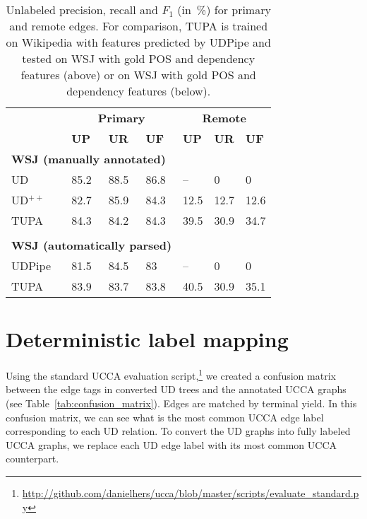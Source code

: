 \documentclass[11pt,a4paper]{article}
\begin{document}
\begin{table}[t]
\centering
\begin{tabular}{l|lll|lll}
& \multicolumn{3}{c|}{\footnotesize \bf Primary} & \multicolumn{3}{c}{\footnotesize \bf Remote} \\
& \footnotesize \textbf{UP} & \footnotesize \textbf{UR} & \footnotesize \textbf{UF}
& \footnotesize \textbf{UP} & \footnotesize \textbf{UR} & \footnotesize \textbf{UF} \\
\hline
\multicolumn{4}{l|}{\small \bf WSJ (manually annotated)} & \\
\footnotesize UD
& 85.2 & 88.5 & 86.8 & -- & 0 & 0 \\
\footnotesize UD$^{++}$
& 82.7 & 85.9 & 84.3 & 12.5 & 12.7 & 12.6 \\
\footnotesize TUPA
& 84.3 & 84.2 & 84.3 & 39.5 & 30.9 & 34.7 \\
\\
\multicolumn{4}{l|}{\small \bf WSJ (automatically parsed)} & \\
UDPipe & 81.5 & 84.5 & 83 & -- & 0 & 0 \\
\footnotesize TUPA
& 83.9 & 83.7 & 83.8 & 40.5 & 30.9 & 35.1
\end{tabular}
\caption{
Unlabeled precision, recall and $F_1$ (in~\%) for primary and remote edges.
For comparison, TUPA \protect\cite{hershcovich2017a} is trained on Wikipedia with features predicted by UDPipe
and tested on WSJ with gold POS and dependency features (above)
or on WSJ with gold POS and dependency features (below).
\label{tab:conversion_results_unlabeled}}
\end{table}


\section{Deterministic label mapping}\label{sec:mapping}

Using the standard UCCA evaluation
script,\footnote{\url{http://github.com/danielhers/ucca/blob/master/scripts/evaluate_standard.py}}
we created a confusion matrix between the edge tags in converted UD trees
and the annotated UCCA graphs (see Table~\ref{tab:confusion_matrix}).
Edges are matched by terminal yield.
In this confusion matrix, we can see what is the most common UCCA edge label corresponding
to each UD relation.
To convert the UD graphs into fully labeled UCCA graphs,
we replace each UD edge label with its most common UCCA counterpart.
\end{document}
